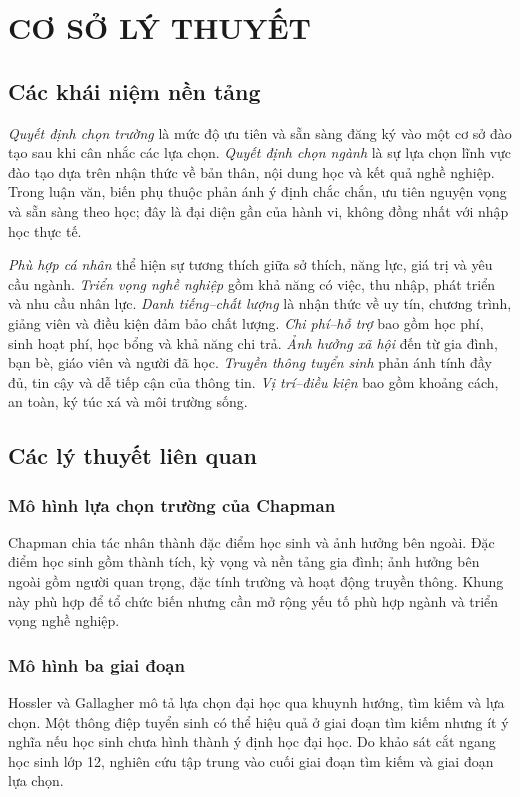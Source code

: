 \chapter{CƠ SỞ LÝ THUYẾT}
\section{Các khái niệm nền tảng}
\textit{Quyết định chọn trường} là mức độ ưu tiên và sẵn sàng đăng ký vào một cơ sở đào tạo sau khi cân nhắc các lựa chọn. \textit{Quyết định chọn ngành} là sự lựa chọn lĩnh vực đào tạo dựa trên nhận thức về bản thân, nội dung học và kết quả nghề nghiệp. Trong luận văn, biến phụ thuộc phản ánh ý định chắc chắn, ưu tiên nguyện vọng và sẵn sàng theo học; đây là đại diện gần của hành vi, không đồng nhất với nhập học thực tế.

\textit{Phù hợp cá nhân} thể hiện sự tương thích giữa sở thích, năng lực, giá trị và yêu cầu ngành. \textit{Triển vọng nghề nghiệp} gồm khả năng có việc, thu nhập, phát triển và nhu cầu nhân lực. \textit{Danh tiếng--chất lượng} là nhận thức về uy tín, chương trình, giảng viên và điều kiện đảm bảo chất lượng. \textit{Chi phí--hỗ trợ} bao gồm học phí, sinh hoạt phí, học bổng và khả năng chi trả. \textit{Ảnh hưởng xã hội} đến từ gia đình, bạn bè, giáo viên và người đã học. \textit{Truyền thông tuyển sinh} phản ánh tính đầy đủ, tin cậy và dễ tiếp cận của thông tin. \textit{Vị trí--điều kiện} bao gồm khoảng cách, an toàn, ký túc xá và môi trường sống.

\section{Các lý thuyết liên quan}
\subsection{Mô hình lựa chọn trường của Chapman}
Chapman \citep{chapman1981} chia tác nhân thành đặc điểm học sinh và ảnh hưởng bên ngoài. Đặc điểm học sinh gồm thành tích, kỳ vọng và nền tảng gia đình; ảnh hưởng bên ngoài gồm người quan trọng, đặc tính trường và hoạt động truyền thông. Khung này phù hợp để tổ chức biến nhưng cần mở rộng yếu tố phù hợp ngành và triển vọng nghề nghiệp.

\subsection{Mô hình ba giai đoạn}
Hossler và Gallagher \citep{hossler1987} mô tả lựa chọn đại học qua khuynh hướng, tìm kiếm và lựa chọn. Một thông điệp tuyển sinh có thể hiệu quả ở giai đoạn tìm kiếm nhưng ít ý nghĩa nếu học sinh chưa hình thành ý định học đại học. Do khảo sát cắt ngang học sinh lớp 12, nghiên cứu tập trung vào cuối giai đoạn tìm kiếm và giai đoạn lựa chọn.

